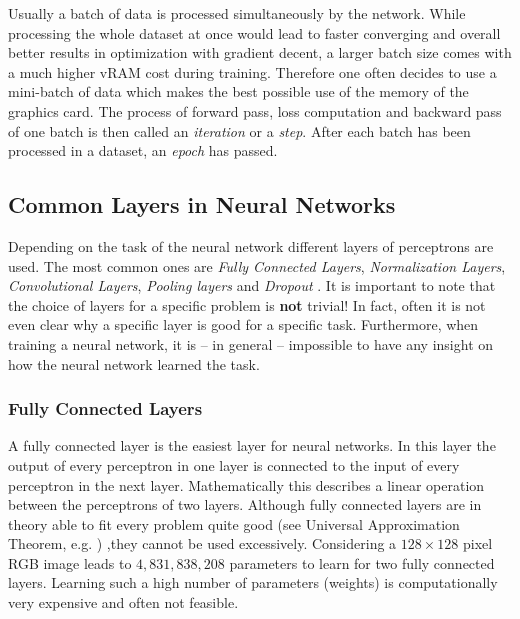 Usually a batch of data is processed simultaneously by the network. While processing the whole dataset at once would lead to faster converging and overall better results in optimization with gradient decent, a larger batch size comes with a much higher vRAM cost during training. Therefore one often decides to use a mini-batch of data which makes the best possible use of the memory of the graphics card. The process of forward pass, loss computation and backward pass of one batch is then called an \textit{iteration} or a \textit{step}. After each batch has been processed in a dataset, an \textit{epoch} has passed.
%
\subsection{Common Layers in Neural Networks} \label{sec:2.1.3}
Depending on the task of the neural network different layers of perceptrons are used. The most common ones are \textit{Fully Connected Layers}, \textit{Normalization Layers}, \textit{Convolutional Layers}, \textit{Pooling layers} and \textit{Dropout }. It is important to note that the choice of layers for a specific problem is \textbf{not} trivial! In fact, often it is not even clear why a specific layer is good for a specific task. Furthermore, when training a neural network, it is – in general – impossible to have any insight on how the neural network learned the task.
%
\subsubsection{Fully Connected Layers}
A fully connected layer is the easiest layer for neural networks. In this layer the output of every perceptron in one layer is connected to the input of every perceptron in the next layer. Mathematically this describes a linear operation between the perceptrons of two layers. Although fully connected layers are in theory able to fit every problem quite good (see Universal Approximation Theorem, e.g. \cite{universal_appr_theorem}) ,they cannot be used excessively. Considering a $128\times128$ pixel RGB image leads to $4,831,838,208$ parameters to learn for two fully connected layers. Learning such a high number of parameters (weights) is computationally very expensive and often not feasible.
%
